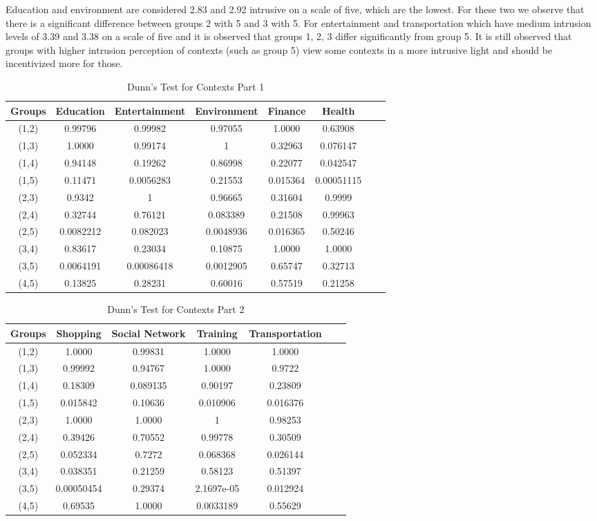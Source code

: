 Education and environment are considered 2.83 and 2.92 intrusive on a scale of five, which are the lowest. For these two we observe that there is a significant difference between groups 2 with 5 and 3 with 5. For entertainment and transportation which have medium intrusion levels of 3.39 and 3.38 on a scale of five and it is observed that groups 1, 2, 3 differ significantly from group 5. It is still observed that groups with higher intrusion perception of contexts (such as group 5) view some contexts in a more intrusive light and should be incentivized more for those.

\begin{table}[h!]
  \centering
  \caption{Dunn's Test for Contexts Part 1}
  \label{tab:dunn_c}
  \begin{tabular}{cccccccc}
    \toprule
     Groups & Education & Entertainment & Environment & Finance & Health  \\
    \midrule
    (1,2)&0.99796&0.99982&0.97055&1.0000&0.63908\\
(1,3)&1.0000&0.99174&1&0.32963&0.076147\\
(1,4)&0.94148&0.19262&0.86998&0.22077&0.042547\\
(1,5)&0.11471&0.0056283&0.21553&0.015364&0.00051115\\
(2,3)&0.9342&1&0.96665&0.31604&0.9999\\
(2,4)&0.32744&0.76121&0.083389&0.21508&0.99963\\
(2,5)&0.0082212&0.082023&0.0048936&0.016365&0.50246\\
(3,4)&0.83617&0.23034&0.10875&1.0000&1.0000\\
(3,5)&0.0064191&0.00086418&0.0012905&0.65747&0.32713\\
(4,5)&0.13825&0.28231&0.60016&0.57519&0.21258\\
    \bottomrule
  \end{tabular}
\end{table}

\begin{table}[h!]
  \centering
  \caption{Dunn's Test for Contexts Part 2}
  \label{tab:dunn_c1}
  \begin{tabular}{ccccccc}
    \toprule
     Groups & Shopping & Social Network & Training & Transportation  \\
    \midrule
(1,2) &1.0000&0.99831&1.0000&1.0000\\
(1,3)&0.99992&0.94767&1.0000&0.9722\\
(1,4)&0.18309&0.089135&0.90197&0.23809\\
(1,5)&0.015842&0.10636&0.010906&0.016376\\
(2,3)&1.0000&1.0000&1&0.98253\\
(2,4)&0.39426&0.70552&0.99778&0.30509\\
(2,5)&0.052334&0.7272&0.068368&0.026144\\
(3,4)&0.038351&0.21259&0.58123&0.51397\\
(3,5)&0.00050454&0.29374&2.1697e-05&0.012924\\
(4,5)&0.69535&1.0000&0.0033189&0.55629\\
  \end{tabular}
\end{table} 



